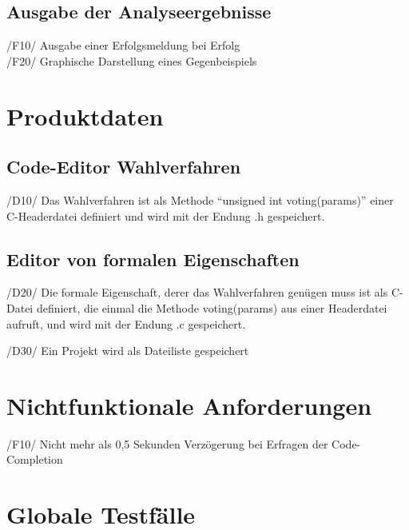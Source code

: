 \documentclass[a4paper]{scrreprt}
\begin{document}
\section{Ausgabe der Analyseergebnisse}
/F10/ Ausgabe einer Erfolgsmeldung bei Erfolg \\
/F20/ Graphische Darstellung eines Gegenbeispiels \\

\chapter{Produktdaten}
\section{Code-Editor Wahlverfahren}
/D10/ Das Wahlverfahren ist als Methode "`unsigned int voting(params)"' einer C-Headerdatei definiert und wird mit der Endung .h gespeichert.

\section{Editor von formalen Eigenschaften}
/D20/ Die formale Eigenschaft, derer das Wahlverfahren genügen muss ist als C-Datei definiert, die einmal die Methode voting(params) aus einer Headerdatei aufruft, und wird mit der Endung .c gespeichert.

/D30/ Ein Projekt wird als Dateiliste gespeichert


\chapter{Nichtfunktionale Anforderungen}
/F10/ Nicht mehr als 0,5 Sekunden Verzögerung bei Erfragen der Code-Completion


\chapter{Globale Testfälle}
\end{document}

